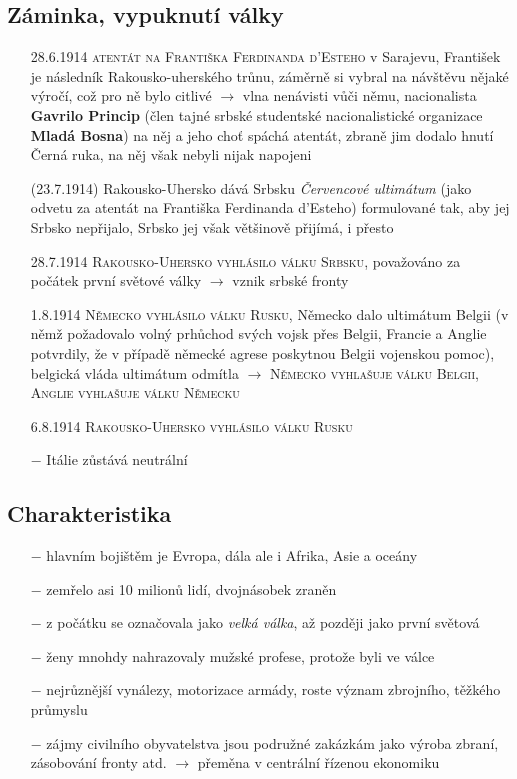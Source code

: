 \documentclass{article}
\begin{document}
\subsection*{Záminka, vypuknutí války}
\begin{itemize}
    \vspace{-0.5em}
    \setlength\itemsep{0.15em}
    \item[28.6.1914] \textsc{atentát na Františka Ferdinanda d'Esteho} v Sarajevu, František je následník Rakousko-uherského trůnu, záměrně si vybral na návštěvu nějaké výročí, což pro ně bylo citlivé $\rightarrow$ vlna nenávisti vůči němu, nacionalista \textbf{Gavrilo Princip} (člen tajné srbské studentské nacionalistické organizace \textbf{Mladá Bosna}) na něj a jeho choť spáchá atentát, zbraně jim dodalo hnutí Černá ruka, na něj však nebyli nijak napojeni
    \item[(23.7.1914)] Rakousko-Uhersko dává Srbsku \textit{Červencové ultimátum}  (jako odvetu za atentát na Františka Ferdinanda d'Esteho) formulované tak, aby jej Srbsko nepřijalo, Srbsko jej však většinově přijímá, i přesto
    \item[28.7.1914] \textsc{Rakousko-Uhersko vyhlásilo válku Srbsku}, považováno za počátek první světové války $\rightarrow$ vznik srbské fronty
    \item[1.8.1914] \textsc{Německo vyhlásilo válku Rusku}, Německo dalo ultimátum Belgii (v němž požadovalo volný prhůchod svých vojsk přes Belgii, Francie a Anglie potvrdily, že v případě německé agrese poskytnou Belgii vojenskou pomoc), belgická vláda ultimátum odmítla $\rightarrow$ \textsc{Německo vyhlašuje válku Belgii}, \textsc{Anglie vyhlašuje válku Německu}
    \item[6.8.1914] \textsc{Rakousko-Uhersko vyhlásilo válku Rusku}
    \item[$-$] Itálie zůstává neutrální
\end{itemize}

\subsection*{Charakteristika}
\begin{itemize}
    \vspace{-0.5em}
    \setlength\itemsep{0.15em}
    \item[$-$] hlavním bojištěm je Evropa, dála ale i Afrika, Asie a oceány
    \item[$-$] zemřelo asi 10 milionů lidí, dvojnásobek zraněn
    \item[$-$] z počátku se označovala jako \textit{velká válka}, až později jako první světová
    \item[$-$] ženy mnohdy nahrazovaly mužské profese, protože byli ve válce
    \item[$-$] nejrůznější vynálezy, motorizace armády, roste význam zbrojního, těžkého průmyslu
    \item[$-$] zájmy civilního obyvatelstva jsou podružné zakázkám jako výroba zbraní, zásobování fronty atd. $\rightarrow$ přeměna v centrální řízenou ekonomiku
\end{itemize}
\end{document}
